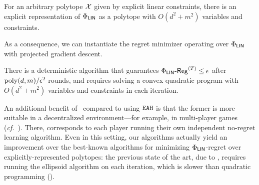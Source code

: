 \begin{theorem}
    \label{theorem:regret}
   For an arbitrary polytope ${\mathcal{X}}$ given by explicit linear constraints, there is an explicit representation of $\Phi_\mathsf{LIN}$ as a polytope with $O(d^2 + m^2)$  variables and constraints.
\end{theorem}
As a consequence, we can instantiate the regret minimizer operating over $\Phi_\mathsf{LIN}$ with projected gradient descent.
\begin{corollary}
    \label{cor:regret}
    There is a deterministic algorithm that guarantees $\Phi_\mathsf{LIN}\text{-}\mathsf{Reg}^{(T)} \leq \epsilon$ after $\mathrm{poly}(d, m)/\epsilon^2$ rounds, and requires solving a convex quadratic program with $O(d^2+m^2)$ variables and constraints in each iteration.
\end{corollary}

An additional benefit of~ compared to using $\mathtt{EAH}$ is that the former is more suitable in a decentralized environment---for example, in multi-player games (\emph{cf.}~). There,  corresponds to each player running their own independent no-regret learning algorithm. Even in this setting, our algorithms actually yield an improvement over the best-known algorithms for minimizing $\Phi_\mathsf{LIN}$-regret over explicitly-represented polytopes: the previous state of the art, due to \citet{Daskalakis24:Efficient}, requires running the ellipsoid algorithm on each iteration, which is slower than quadratic programming ().